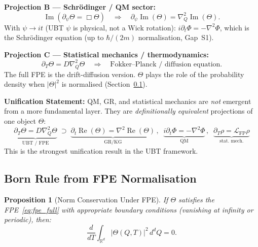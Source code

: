 \documentclass[12pt,a4paper]{article}
\newtheorem{proposition}[theorem]{Proposition}
\theoremstyle{definition}
\theoremstyle{remark}
\begin{document}
\begin{resultbox}
\textbf{Projection B --- Schr\"{o}dinger / QM sector:}
\begin{equation}
  \operatorname{Im}\!\left(\partial_\psi\Theta = \Box\Theta\right)
  \quad\Longrightarrow\quad
  \partial_\psi\operatorname{Im}(\Theta) = \nabla_Q^2\operatorname{Im}(\Theta).
\label{eq:proj_B}
\end{equation}
With $\psi \to it$ (UBT $\psi$ is physical, not a Wick rotation):
$i\partial_t\Phi = -\nabla^2\Phi$, which is the Schr\"{o}dinger equation
(up to $\hbar/(2m)$ normalisation, Gap~S1).
\end{resultbox}

\begin{resultbox}
\textbf{Projection C --- Statistical mechanics / thermodynamics:}
\begin{equation}
  \partial_T\Theta = D\nabla_Q^2\Theta
  \quad\Longrightarrow\quad
  \text{Fokker--Planck / diffusion equation.}
\label{eq:proj_C}
\end{equation}
The full FPE is the drift-diffusion version.  $\Theta$ plays the role
of the probability density when $|\Theta|^2$ is normalised (Section~\ref{subsec:born}).
\end{resultbox}

\begin{insightbox}
\textbf{Unification Statement:}
QM, GR, and statistical mechanics are \emph{not} emergent from a
more fundamental layer.  They are \emph{definitionally equivalent}
projections of one object $\Theta$:
\[
  \underbrace{\partial_T\Theta = D\nabla_Q^2\Theta}_{\text{UBT / FPE}}
  \;\supset\;
  \underbrace{\partial_t\operatorname{Re}(\Theta) = \nabla^2\operatorname{Re}(\Theta)}_{\text{GR/KG}}
  \,,\;\;
  \underbrace{i\partial_t\Phi = -\nabla^2\Phi}_{\text{QM}}
  \,,\;\;
  \underbrace{\partial_T\rho = \mathcal{L}_{\mathrm{FP}}\rho}_{\text{stat.\ mech.}}
\]
This is the strongest unification result in the UBT framework.
\end{insightbox}

\subsection{Born Rule from FPE Normalisation}
\label{subsec:born}

\begin{proposition}[Norm Conservation Under FPE]
\label{prop:norm_conservation}
If $\Theta$ satisfies the FPE~\eqref{eq:fpe_full} with appropriate
boundary conditions (vanishing at infinity or periodic), then:
\begin{equation}
  \frac{d}{dT}\int_{\mathbb{R}^d} |\Theta(Q,T)|^2\, d^dQ = 0.
\label{eq:norm_conservation}
\end{equation}
\end{proposition}
\end{document}
